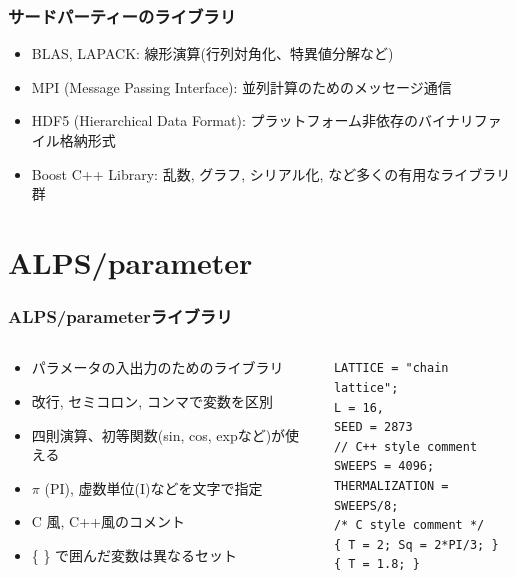 \begin{frame}
  \frametitle{サードパーティーのライブラリ}
  \begin{itemize}
    \setlength{\itemsep}{1em}
  \item BLAS, LAPACK: 線形演算(行列対角化、特異値分解など)
  \item MPI (Message Passing Interface): 並列計算のためのメッセージ通信
  \item HDF5 (Hierarchical Data Format): プラットフォーム非依存のバイナリファイル格納形式
  \item Boost C++ Library: 乱数, グラフ, シリアル化, など多くの有用なライブラリ群
  \end{itemize}
\end{frame}

\section{ALPS/parameter}
\begin{frame}[t,fragile]
  \frametitle{ALPS/parameterライブラリ}
  \begin{columns}[T]
    \begin{column}{.5\textwidth}
      \begin{itemize}
      \item パラメータの入出力のためのライブラリ
        \item 改行, セミコロン, コンマで変数を区別
        \item 四則演算、初等関数(sin, cos, expなど)が使える
        \item $\pi$ (PI), 虚数単位(I)などを文字で指定
          \item C 風, C++風のコメント
          \item \{ \} で囲んだ変数は異なるセット
      \end{itemize}
    \end{column}
    \begin{column}{.5\textwidth}
    \begin{lstlisting}
LATTICE = "chain lattice";
L = 16,
SEED = 2873
// C++ style comment
SWEEPS = 4096;
THERMALIZATION = SWEEPS/8;
/* C style comment */
{ T = 2; Sq = 2*PI/3; }
{ T = 1.8; }
    \end{lstlisting}
    \end{column}
  \end{columns}
\end{frame}

